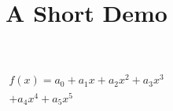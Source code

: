 \documentclass[article]{jss}
\title{A Short Demo}
\begin{document}
\begin{multline}
f(x) = a_0 + a_1 x + a_2 x^2 + a_3 x^3 \\
+ a_4 x^4 + a_5 x^5
\end{multline}
\end{document}
